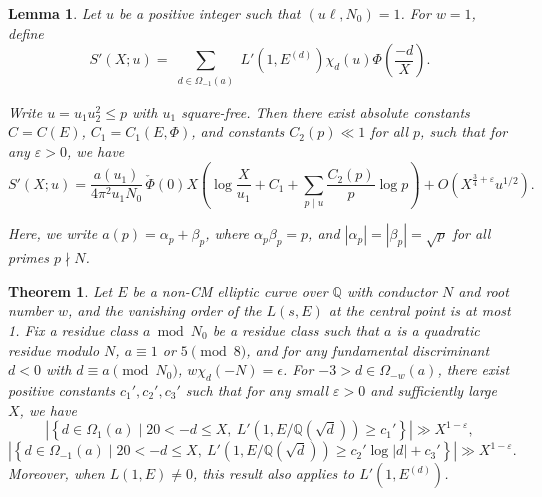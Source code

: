 \documentclass[10pt,a4paper]{amsart}
\newtheorem{theorem}{Theorem}
\newtheorem{lemma}{Lemma}
\begin{document}
\begin{lemma}\label{lemma:twist}
Let \( u \) be a positive integer such that \( (u\ell, N_0) = 1 \).
For \( w = 1 \), define
\begin{equation*}
  S'(X; u) = \sum_{\substack{d \in \Omega_{-1}(a)}}
  L'\left(1, E^{(d)}\right) \chi_d(u)
  \Phi\left(\frac{-d}{X}\right).
\end{equation*}

Write \( u = u_1 u_2^2 \leq p \) with \( u_1 \) square-free.
Then there exist absolute constants \( C = C(E) \), \( C_1 = C_1(E, \Phi) \), and constants \( C_2(p) \ll 1 \) for all \( p \), such that for any \( \varepsilon > 0 \), we have
\begin{equation*}
  S'(X; u) = \frac{a(u_1)}{4\pi^2 u_1 N_0} \,
  \check{\Phi}(0) X \left( \log \frac{X}{u_1} + C_1 + \sum_{p \mid u} \frac{C_2(p)}{p} \log p \right)
  + O\left(X^{\frac{3}{4} + \varepsilon} u^{1/2}\right).
\end{equation*}

Here, we write \( a(p) = \alpha_p + \beta_p \), where \( \alpha_p \beta_p = p \), and \( |\alpha_p| = |\beta_p| = \sqrt{p} \) for all primes \( p \nmid N \).
\end{lemma}

\begin{theorem}\label{thm:lowerbound-L}
Let \( E \) be a non-CM elliptic curve over \( \mathbb{Q} \) with conductor \( N \) and root number \( w \), and the vanishing order of the \(L(s,E)\) at the central point is at most 1.
Fix a residue class \( a \bmod N_0 \) be a residue class such that \( a \) is a quadratic residue modulo \( N \), \( a \equiv 1 \) or \( 5 \pmod{8} \),
and for any fundamental discriminant $d<0$ with $d\equiv a \pmod{N_0}$, $ w\chi_d(-N)=\epsilon$.
For \( -3>d\in  \Omega_{-w}(a)\), there exist positive constants \( c_1', c_2', c_3' \) such that for any small \( \varepsilon > 0 \) and sufficiently large \( X \), we have
\[
\left|\left\{
 d \in \Omega_{1}(a) \mid 20 < -d \leq X,\
L'(1, E/\mathbb{Q}(\sqrt{d})) \geq c_1'
\right\}\right| \gg X^{1 - \varepsilon},
\]
\[
\left|\left\{
 d \in \Omega_{-1}(a) \mid 20 < -d \leq X,\
L'(1, E/\mathbb{Q}(\sqrt{d}))\geq c_2' \log|d| + c_3'
\right\}\right| \gg X^{1 - \varepsilon}.
\]
Moreover, when \(L(1,E)\neq 0\), this result also applies to \(L'(1, E^{(d)})\).
\end{theorem}
\end{document}
